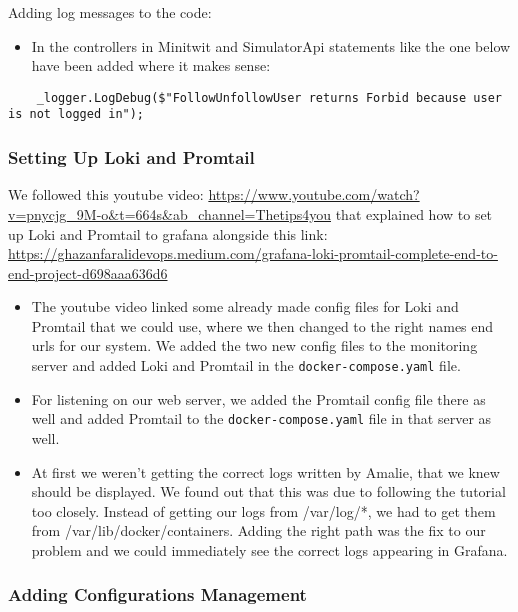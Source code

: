 Adding log messages to the code:

\begin{itemize}
    \item In the controllers in Minitwit and SimulatorApi statements like the one below have been added where it makes sense:
\end{itemize}


\begin{verbatim}
    _logger.LogDebug($"FollowUnfollowUser returns Forbid because user is not logged in");
\end{verbatim}

\subsubsection{Setting Up Loki and Promtail}
\label{log:setting-up-loki-and-promtail}

We followed this youtube video: \url{https://www.youtube.com/watch?v=pnycjg_9M-o\&t=664s\&ab_channel=Thetips4you} that explained how to set up Loki and Promtail to grafana alongside this link: \url{https://ghazanfaralidevops.medium.com/grafana-loki-promtail-complete-end-to-end-project-d698aaa636d6}

\begin{itemize}
    \item The youtube video linked some already made config files for Loki and Promtail that we could use, where we then changed to the right names end urls for our system. We added the two new config files to the monitoring server and added Loki and Promtail in the \texttt{docker-compose.yaml} file.
    \item For listening on our web server, we added the Promtail config file there as well and added Promtail to the \texttt{docker-compose.yaml} file in that server as well.
    \item At first we weren't getting the correct logs written by Amalie, that we knew should be displayed. We found out that this was due to following the tutorial too closely. Instead of getting our logs from /var/log/*, we had to get them from /var/lib/docker/containers. Adding the right path was the fix to our problem and we could immediately see the correct logs appearing in Grafana.
\end{itemize}

\subsubsection{Adding Configurations Management}
\label{log:adding-configurations-management}

